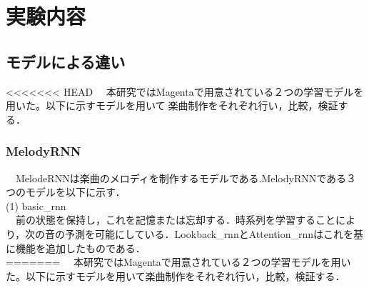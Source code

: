 \chapter{実験内容}
\section{モデルによる違い}
<<<<<<< HEAD
　本研究ではMagentaで用意されている２つの学習モデルを用いた。以下に示すモデルを用いて楽曲制作をそれぞれ行い，比較，検証する．\\

\subsection{MelodyRNN}
　MelodeRNNは楽曲のメロディを制作するモデルである.MelodyRNNである３つのモデルを以下に示す．\\
(1)	basic_rnn\\
　前の状態を保持し，これを記憶または忘却する．時系列を学習することにより，次の音の予測を可能にしている．Lookback_rnnとAttention_rnnはこれを基に機能を追加したものである．\\
=======
　本研究ではMagentaで用意されている２つの学習モデルを用いた。以下に示すモデルを用いて楽曲制作をそれぞれ行い，比較，検証する．\\

